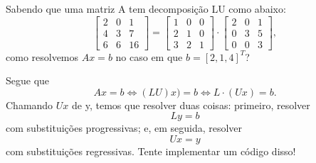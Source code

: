 \documentclass[../numerical_methods.tex]{subfiles}
\begin{document}
\begin{example}
	Sabendo que uma matriz A tem decomposição LU como abaixo:
	\[
		\begin{bmatrix}
			2 & 0 & 1  \\
			4 & 3 & 7  \\
			6 & 6 & 16
		\end{bmatrix} = \begin{bmatrix}
			1 & 0 & 0 \\
			2 & 1 & 0 \\
			3 & 2 & 1
		\end{bmatrix} \cdot \begin{bmatrix}
			2 & 0 & 1 \\
			0 & 3 & 5 \\
			0 & 0 & 3
		\end{bmatrix},
	\]
	como resolvemos \(Ax = b\) no caso em que \(b = [2, 1, 4]^{T}\)?

	Segue que
	\[
		Ax = b \Longleftrightarrow (LU)x) = b \Longleftrightarrow L \cdot (Ux) = b.
	\]
	Chamando \(Ux\) de y, temos que resolver duas coisas: primeiro, resolver
	\[
		Ly = b
	\]
	com substituições progressivas; e, em seguida, resolver
	\[
		Ux = y
	\]
	com substituições regressivas. Tente implementar um código disso!
\end{example}
\end{document}
